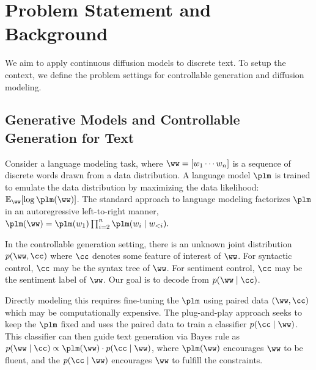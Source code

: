 \vspace{-2mm}
\section{Problem Statement and Background}
\label{sec:background}

We aim to apply continuous diffusion models to discrete text. To setup the context, we define the problem settings for controllable generation and diffusion modeling.

\subsection{Generative Models and Controllable Generation for Text} 
\label{ssec:control_setup}
Consider a language modeling task, where $\ww = [w_1 \cdots w_n]$ is a sequence of discrete words drawn from a data distribution. A language model $\plm$ is trained to emulate the data distribution by maximizing the data likelihood: $\mathbb{E}_{\ww} [\log \plm(\ww)]$.
The standard approach to language modeling factorizes $\plm$ in an autoregressive left-to-right manner,
$\plm(\ww) = \plm(w_1) \prod_{i=2} ^n \plm(w_i \mid w_{<i}).$


In the controllable generation setting, there is an unknown joint distribution $p(\ww, \cc)$
where $\cc$ denotes some feature of interest of $\ww$. For syntactic control, $\cc$ may be the syntax tree of $\ww$. For sentiment control, $\cc$ may be the sentiment label of $\ww$. Our goal is to decode from $p(\ww \mid \cc)$. 

Directly modeling this requires fine-tuning the $\plm$ using paired data $(\ww,\cc)$ which may be computationally expensive. The plug-and-play approach seeks to keep the $\plm$ fixed and uses the paired data to train a classifier $p(\cc \mid \ww)$.
This classifier can then guide text generation via Bayes rule as $p(\ww \mid \cc) \propto \plm(\ww) \cdot p(\cc \mid \ww)$, where $\plm(\ww)$ encourages $\ww$ to be fluent, and the $p(\cc \mid \ww)$ encourages $\ww$ to fulfill the constraints. 

